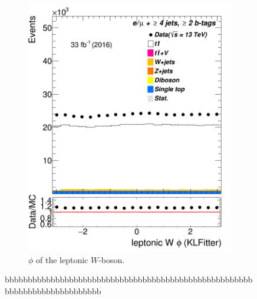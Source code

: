 \begin{figure}
\begin{subfigure}{0.35\textwidth}
		\includegraphics[width=\linewidth]{ControlPlots_emujets_2016_4incl_2incl/klf_Wlep_phi_emujets_2016.png}
		\caption{$\phi$ of the leptonic $W$-boson.} \label{fig:40}
	\end{subfigure}
	\caption{bbbbbbbbbbbbbbbbbbbbbbbbbbbbbbbbbbbbbbbbbbbbbbbbbbbbbbbbbbbbbbbbbbbbbbbbbbb}
\end{figure}	



